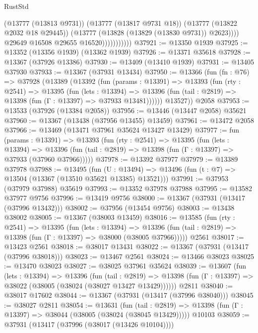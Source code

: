 \begin{lexlean}{RustStd}
\begin{coremodule}
                              (@13777 (@13813 @9731))
                              (@13777 (@13817 @9731 @18))
                              (@13777 (@13822 @2032 @18 @29445))
                              (@13777 (@13828 (@13829 (@13830 @9731)) @2623))))
                          @29649
                          @16508
                          @29655
                          @16520)))))))))))
@37921 := @13350 @1939
@37925 := @13352 (@13356 @1939) (@13362 @1939)
@37926 := @13371 @35618
@37928 := @13367 (@37926 @13386)
@37930 := @13409 (@13410 @1939)
@37931 := @13405 @37930
@37933 := @13367 (@37931 @13434)
@37950 := @13366
    (fun (fn : @76) =>
    @37928
      (@13389
        (@13392
          (fun (params : @13391) =>
          @13393
            (fun (rty : @2541) =>
            @13395
              (fun (lets : @13394) =>
              @13396 (fun (tail : @2819) => @13398 (fun (Γ : @13397) => @37933 @13481))))))
        @13527))
    @2058
@37953 := @13533 (@37926 (@13384 @2058))
@37956 := @13446 (@13447 @2058) @35621
@37960 := @13367 (@13438 (@37956 @13455) @13459)
@37961 := @13472 @2058
@37966 := @13469 (@13471 @37961 @35624 @13427 @13429)
@37977 := fun (params : @13391) =>
  @13393
    (fun (rty : @2541) =>
    @13395
      (fun (lets : @13394) =>
      @13396 (fun (tail : @2819) => @13398 (fun (Γ : @13397) => @37933 (@37960 @37966)))))
@37978 := @13392 @37977
@37979 := @13389 @37978
@37988 := @13495
    (fun (U : @13494) => @13496 (fun (t : @7) => @13504 (@13367 (@13510 @35621 @13385) @13521)))
@37991 := @37953 (@37979 @37988) @35619
@37993 := @13352 @37978 @37988
@37995 := @13582 @37977 @9756
@37996 := @13419 @9756
@38000 := @13367 (@37931 (@13417 (@37996 @13432)))
@38002 := @37956 (@13454 @9756)
@38003 := @13438 @38002
@38005 := @13367 (@38003 @13459)
@38016 := @13585
    (fun (rty : @2541) =>
    @13395
      (fun (lets : @13394) =>
      @13396 (fun (tail : @2819) => @13398 (fun (Γ : @13397) => @38000 (@38005 @37966)))))
    @2561
@38017 := @13423 @2561
@38018 := @38017 @13431
@38022 := @13367 (@37931 (@13417 (@37996 @38018)))
@38023 := @13467 @2561
@38024 := @13466 @38023
@38025 := @13470 @38023
@38027 := @38025 @37961 @35624
@38039 := @13607
    (fun (lets : @13394) =>
    @13396
      (fun (tail : @2819) =>
      @13398 (fun (Γ : @13397) => @38022 (@38005 (@38024 (@38027 @13427 @13429))))))
    @2811
@38040 := @38017 @17602
@38044 := @13367 (@37931 (@13417 (@37996 @38040)))
@38045 := @38027 @2811
@38054 := @13631
    (fun (tail : @2819) => @13398 (fun (Γ : @13397) => @38044 (@38005 (@38024 (@38045 @13429)))))
    @10103
@38059 := @37931 (@13417 (@37996 (@38017 (@13426 @10104))))

\end{coremodule}
\end{lexlean}
